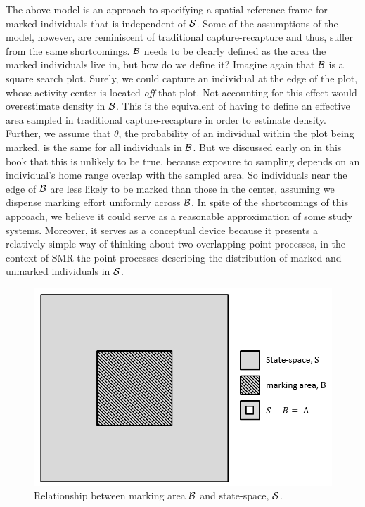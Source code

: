The above
model is an approach to specifying a spatial reference frame for
marked individuals that is independent of ${\cal S}$.
Some of the assumptions of the model, however, are reminiscent of traditional capture-recapture and thus, suffer from the same shortcomings. ${\cal B}$ needs to be clearly defined as the area the marked individuals live in, but how do we define it? Imagine again that ${\cal B}$ is a square search plot. Surely, we could capture an individual at the edge of the plot, whose activity center is located \emph{off} that plot. Not accounting for this effect would overestimate density in ${\cal B}$. This is the equivalent of having to define an effective area sampled in traditional capture-recapture in order to estimate density. Further, we assume that $\theta$, the probability of an individual within the plot being marked, is the same for all individuals in ${\cal B}$. But we discussed early on in this book that this is unlikely to be true, because exposure to sampling depends on an individual's home range overlap with the sampled area. So individuals near the edge of ${\cal B}$ are less likely to be marked than those in the center, assuming we dispense marking effort uniformly across ${\cal B}$. In spite of the shortcomings of this approach, we believe it could serve as a reasonable approximation of some study systems. Moreover, it serves as a conceptual device because it presents a relatively simple way of thinking about two overlapping point processes, in the context of SMR the point processes describing the distribution of marked and unmarked individuals in ${\cal S}$.


\begin{figure}[ht]
\begin{center}
\includegraphics[width=5in]{Ch19-PartialID/figs/scrPIDBox.png}
\end{center}
\caption{
Relationship between marking area ${\cal B}$ and state-space, ${\cal S}$.
}
\label{partialID.fig.Box}
\end{figure}

